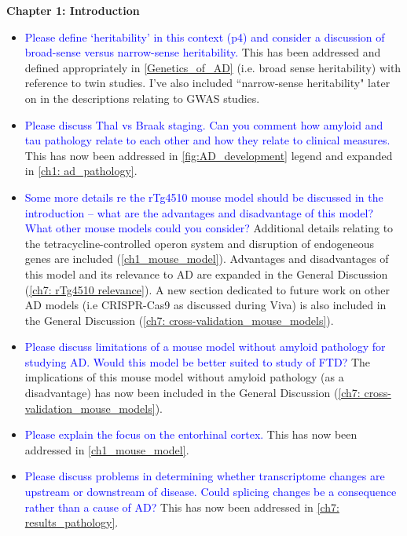 \documentclass[a4paper,12pt,oneside]{report}
\begin{document}
\textbf{Chapter 1: Introduction}
\begin{itemize}
	\item \textcolor{blue}{Please define ‘heritability’ in this context (p4) and consider a discussion of broad-sense versus narrow-sense heritability.} 
	This has been addressed and defined appropriately in \cref{Genetics_of_AD} (i.e. broad sense heritability) with reference to twin studies. I've also included “narrow-sense heritability" later on in the descriptions relating to GWAS studies.	
	\item \textcolor{blue}{Please discuss Thal vs Braak staging. Can you comment how amyloid and tau pathology relate to each other and how they relate to clinical measures.}
	This has now been addressed in \cref{fig:AD_development} legend and expanded in \cref{ch1: ad_pathology}.
	\item \textcolor{blue}{Some more details re the rTg4510 mouse model should be discussed in the introduction – what are the advantages and disadvantage of this model? What other mouse models could you consider?} 
	\newline Additional details relating to the tetracycline-controlled operon system and disruption of endogeneous genes are included (\cref{ch1_mouse_model}).
	\newline Advantages and disadvantages of this model and its relevance to AD are expanded in the General Discussion (\cref{ch7: rTg4510 relevance}). A new section dedicated to future work on other AD models (i.e CRISPR-Cas9 as discussed during Viva) is also included in the General Discussion (\cref{ch7: cross-validation_mouse_models}).  
	\item \textcolor{blue}{Please discuss limitations of a mouse model without amyloid pathology for studying AD. Would this model be better suited to study of FTD?} 
	\newline The implications of this mouse model without amyloid pathology (as a disadvantage) has now been included in the General Discussion (\cref{ch7: cross-validation_mouse_models}).
	\item \textcolor{blue}{Please explain the focus on the entorhinal cortex.} 
	\newline This has now been addressed in \cref{ch1_mouse_model}.
	\item \textcolor{blue}{Please discuss problems in determining whether transcriptome changes are upstream or downstream of disease. Could splicing changes be a consequence rather than a cause of AD?}
	\newline This has now been addressed in \cref{ch7: results_pathology}.
\end{itemize}
\end{document}
